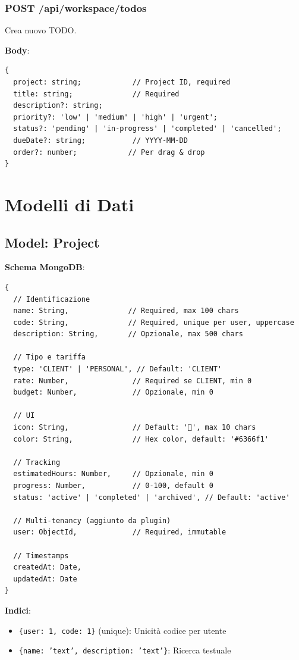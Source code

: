 \documentclass[11pt,a4paper]{article}
\begin{document}
\subsubsection{POST /api/workspace/todos}

Crea nuovo TODO.

\textbf{Body}:
\begin{lstlisting}
{
  project: string;            // Project ID, required
  title: string;              // Required
  description?: string;
  priority?: 'low' | 'medium' | 'high' | 'urgent';
  status?: 'pending' | 'in-progress' | 'completed' | 'cancelled';
  dueDate?: string;           // YYYY-MM-DD
  order?: number;            // Per drag & drop
}
\end{lstlisting}

\newpage

\section{Modelli di Dati}

\subsection{Model: Project}

\textbf{Schema MongoDB}:

\begin{lstlisting}
{
  // Identificazione
  name: String,              // Required, max 100 chars
  code: String,              // Required, unique per user, uppercase
  description: String,       // Opzionale, max 500 chars
  
  // Tipo e tariffa
  type: 'CLIENT' | 'PERSONAL', // Default: 'CLIENT'
  rate: Number,               // Required se CLIENT, min 0
  budget: Number,             // Opzionale, min 0
  
  // UI
  icon: String,               // Default: '📂', max 10 chars
  color: String,              // Hex color, default: '#6366f1'
  
  // Tracking
  estimatedHours: Number,     // Opzionale, min 0
  progress: Number,           // 0-100, default 0
  status: 'active' | 'completed' | 'archived', // Default: 'active'
  
  // Multi-tenancy (aggiunto da plugin)
  user: ObjectId,             // Required, immutable
  
  // Timestamps
  createdAt: Date,
  updatedAt: Date
}
\end{lstlisting}

\textbf{Indici}:
\begin{itemize}
    \item \texttt{\{user: 1, code: 1\}} (unique): Unicità codice per utente
    \item \texttt{\{name: 'text', description: 'text'\}}: Ricerca testuale
\end{itemize}
\end{document}
